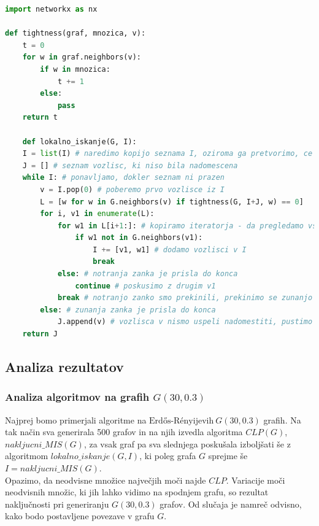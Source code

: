 \documentclass[a4paper, 12pt]{article}
\begin{document}
\begin{lstlisting}[language=Python, basicstyle=\tiny]
import networkx as nx

def tightness(graf, mnozica, v): 
    t = 0
    for w in graf.neighbors(v):
        if w in mnozica:
            t += 1
        else:
            pass
    return t

    def lokalno_iskanje(G, I):
    I = list(I) # naredimo kopijo seznama I, oziroma ga pretvorimo, ce ni v obliki seznama
    J = [] # seznam vozlisc, ki niso bila nadomescena
    while I: # ponavljamo, dokler seznam ni prazen
        v = I.pop(0) # poberemo prvo vozlisce iz I
        L = [w for w in G.neighbors(v) if tightness(G, I+J, w) == 0]
        for i, v1 in enumerate(L):
            for w1 in L[i+1:]: # kopiramo iteratorja - da pregledamo vsak par enkrat
                if w1 not in G.neighbors(v1):
                    I += [v1, w1] # dodamo vozlisci v I
                    break
            else: # notranja zanka je prisla do konca
                continue # poskusimo z drugim v1
            break # notranjo zanko smo prekinili, prekinimo se zunanjo
        else: # zunanja zanka je prisla do konca
            J.append(v) # vozlisca v nismo uspeli nadomestiti, pustimo ga v izhodu
    return J
\end{lstlisting}

\subsection{Analiza rezultatov}

\subsubsection{Analiza algoritmov na grafih $G(30, 0.3)$}

Najprej bomo primerjali algoritme na $\text{Erdős-Rényijevih}\ G(30, 0.3)$ grafih. Na tak način sva generirala 500 grafov in na njih izvedla algoritma $CLP(G)$, $nakljucni\_MIS(G)$, za vsak graf pa sva slednjega poskušala izboljšati
še z algoritmom $lokalno\_iskanje(G, I)$, ki poleg grafa $G$ sprejme še $I = nakljucni\_MIS(G)$.\\

\noindent Opazimo, da neodvisne množice največjih moči najde $CLP$. Variacije moči neodvisnih množic,
ki jih lahko vidimo na spodnjem grafu, so rezultat naključnosti pri generiranju $G(30, 0.3)$ grafov.
Od slučaja je namreč odvisno, kako bodo postavljene povezave v grafu $G$.
\end{document}
